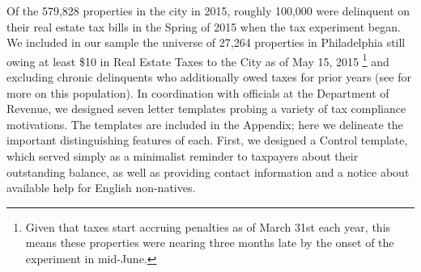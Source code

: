 \documentclass[12pt,titlepage]{article}
\begin{document}
%

Of the 579,828 properties in the city in 2015, roughly 100,000 were
delinquent on their real estate tax bills in the Spring of 2015 when
the tax experiment began. We included in our sample the universe of 27,264
properties in Philadelphia still owing at least \$10 in Real Estate
Taxes to the City as of May 15, 2015
\footnote{
	Given that taxes start accruing penalties as of 
	March 31st each year, this means these properties were 
	nearing three months late by the onset of the 
	experiment in mid-June.
}
and excluding chronic delinquents who additionally owed taxes for 
prior years (see \citep*{chirico} for more on this population). 
In coordination with officials at the Department of Revenue, we designed 
seven letter templates probing a variety of tax compliance motivations. 
The templates are included in the Appendix; here we delineate the important 
distinguishing features of each. First, we designed a Control template, which 
served simply as a minimalist reminder to taxpayers about their outstanding 
balance, as well as providing contact information and a notice about 
available help for English non-natives.
\end{document}
